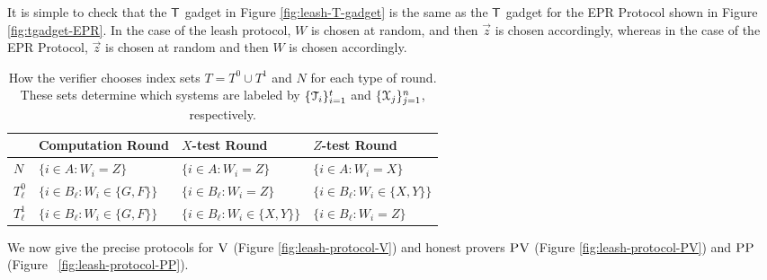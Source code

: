 It is simple to check that the $\sf T$ gadget in Figure \ref{fig:leash-T-gadget} is the same as the $\sf T$ gadget for the EPR Protocol shown in Figure \ref{fig:tgadget-EPR}. In the case of the leash protocol, $W$ is chosen at random, and then $\vec{z}$ is chosen accordingly, whereas in the case of the EPR Protocol, $\vec{z}$ is chosen at random and then $W$ is chosen accordingly. 




\begin{table}[H]
\centering
\setlength\tabcolsep{1.5pt}
\begin{tabular}{|l|lll|}
\hline
& Computation Round & $X$-test Round & $Z$-test Round\\
\hline
$N$ %
& $\{i\in A:W_i=Z\}$ & $\{i\in A:W_i=Z\}$ & $\{i\in A:W_i=X\}$\\
$T^0_{\ell}$ %
& $\{i\in B_{\ell}:W_i\in \{G,F\}\}$ & $\{i\in B_{\ell}:W_i=Z\}$ & $\{i\in B_{\ell}:W_i\in \{X,Y\}\}$ \\
$T^1_{\ell}$ %
& $\{i\in B_{\ell}:W_i\in \{G,F\}\}$ & $\{i\in B_{\ell}:W_i\in \{X,Y\}\}$ & $\{i\in B_{\ell}:W_i=Z\}$ \\
\hline
\end{tabular}
\caption{How the verifier chooses index sets $T=T^0\cup T^1$ and $N$ for each type of round. These sets determine which systems are labeled by $\{{\cal T}_{i}\}_{i=1}^t$ and $\{{\cal X}_{j}\}_{j=1}^n$, respectively.}\label{tab:index-choices}
\end{table}

\noindent We now give the precise protocols for $\textsc{V}$ (Figure \ref{fig:leash-protocol-V})
and honest provers $\textsc{PV}$ (Figure \ref{fig:leash-protocol-PV}) and $\textsc{PP}$ (Figure~
\ref{fig:leash-protocol-PP}). 

